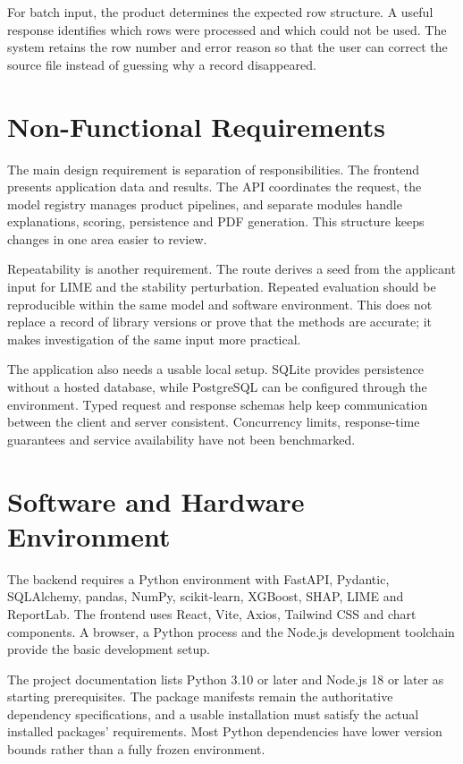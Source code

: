 For batch input, the product determines the expected row structure. A useful response identifies which rows were processed and which could not be used. The system retains the row number and error reason so that the user can correct the source file instead of guessing why a record disappeared.

\section{Non-Functional Requirements}
The main design requirement is separation of responsibilities. The frontend presents application data and results. The API coordinates the request, the model registry manages product pipelines, and separate modules handle explanations, scoring, persistence and PDF generation. This structure keeps changes in one area easier to review.

Repeatability is another requirement. The route derives a seed from the applicant input for LIME and the stability perturbation. Repeated evaluation should be reproducible within the same model and software environment. This does not replace a record of library versions or prove that the methods are accurate; it makes investigation of the same input more practical.

The application also needs a usable local setup. SQLite provides persistence without a hosted database, while PostgreSQL can be configured through the environment. Typed request and response schemas help keep communication between the client and server consistent. Concurrency limits, response-time guarantees and service availability have not been benchmarked.

\section{Software and Hardware Environment}
The backend requires a Python environment with FastAPI, Pydantic, SQLAlchemy, pandas, NumPy, scikit-learn, XGBoost, SHAP, LIME and ReportLab. The frontend uses React, Vite, Axios, Tailwind CSS and chart components. A browser, a Python process and the Node.js development toolchain provide the basic development setup.

The project documentation lists Python 3.10 or later and Node.js 18 or later as starting prerequisites. The package manifests remain the authoritative dependency specifications, and a usable installation must satisfy the actual installed packages' requirements. Most Python dependencies have lower version bounds rather than a fully frozen environment.

